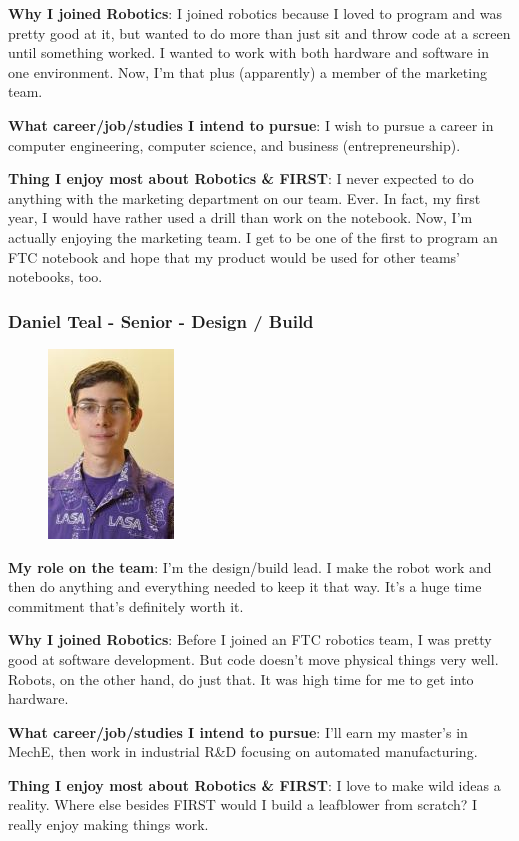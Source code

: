 {\bf Why I joined Robotics}: I joined robotics because I loved to program and was pretty good at it, but wanted to do more than just sit and throw code at a screen until something worked.  I wanted to work with both hardware and software in one environment.  Now, I'm that plus (apparently) a member of the marketing team.

{\bf What career/job/studies I intend to pursue}: I wish to pursue a career in computer engineering, computer science, and business (entrepreneurship).

{\bf Thing I enjoy most about Robotics \& FIRST}: I never expected to do anything with the marketing department on our team.  Ever.  In fact, my first year, I would have rather used a drill than work on the notebook.  Now, I'm actually enjoying the marketing team.  I get to be one of the first to program an FTC notebook and hope that my product would be used for other teams' notebooks, too.

\subsubsection{Daniel Teal - Senior - Design / Build} 
\begin{figure}[H]
	\includegraphics[width=0.2\linewidth]{daniel}
\end{figure}
{\bf My role on the team}: I'm the design/build lead. I make the robot work and then do anything and everything needed to keep it that way. It's a huge time commitment that's definitely worth it.

{\bf Why I joined Robotics}: Before I joined an FTC robotics team, I was pretty good at software development. But code doesn't move physical things very well. Robots, on the other hand, do just that. It was high time for me to get into hardware.

{\bf What career/job/studies I intend to pursue}: I'll earn my master's in MechE, then work in industrial R\&D focusing on automated manufacturing.

{\bf Thing I enjoy most about Robotics \& FIRST}: I love to make wild ideas a reality. Where else besides FIRST would I build a leafblower from scratch? I really enjoy making things work.  

